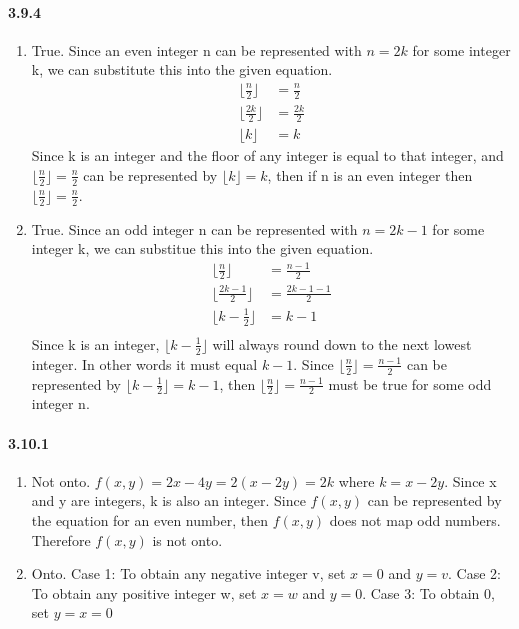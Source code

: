 \documentclass[11pt, letterpaper, twocolumn, fleqn]{article}
\begin{document}
    \paragraph{3.9.4}
    \renewcommand{\labelenumi}{\alph{enumi}.}
    \begin{enumerate}
        \item 
            True. Since an even integer n can be represented with $n = 2k$ for some integer k, we can substitute this into the given equation. 
            \begin{align*}
                \lfloor \frac{n}{2} \rfloor &= \frac{n}{2} \\
                \lfloor \frac{2k}{2} \rfloor &= \frac{2k}{2} \\
                \lfloor k \rfloor &= k
            \end{align*}
            Since k is an integer and the floor of any integer is equal to that integer, and $\lfloor \frac{n}{2} \rfloor = \frac{n}{2}$ can be represented by $\lfloor k \rfloor = k$, then if n is an even integer then $\lfloor \frac{n}{2} \rfloor = \frac{n}{2}$.
        \item 
            True. Since an odd integer n can be represented with $n = 2k-1$ for some integer k, we can substitue this into the given equation.
            \begin{align*}
                \lfloor \frac{n}{2} \rfloor     &= \frac{n-1}{2} \\
                \lfloor \frac{2k-1}{2} \rfloor  &= \frac{2k-1-1}{2} \\
                \lfloor k - \frac{1}{2} \rfloor &= k-1 \\
            \end{align*}
            Since k is an integer, $\lfloor k - \frac{1}{2} \rfloor$ will always round down to the next lowest integer. In other words it must equal $k-1$. Since $\lfloor \frac{n}{2} \rfloor = \frac{n-1}{2}$ can be represented by $\lfloor k - \frac{1}{2} \rfloor = k-1$, then $\lfloor \frac{n}{2} \rfloor = \frac{n-1}{2}$ must be true for some odd integer n.
    \end{enumerate}
    
    \paragraph{3.10.1}
    \renewcommand{\labelenumi}{\alph{enumi}.}
    \begin{enumerate}
        \item Not onto. $f(x,y)=2x-4y=2(x-2y)=2k$ where $k=x-2y$. Since x and y are integers, k is also an integer. Since $f(x,y)$ can be represented by the equation for an even number, then $f(x,y)$ does not map odd numbers. Therefore $f(x,y)$ is not onto.
        \item Onto. \newline
        Case 1: To obtain any negative integer v, set $x = 0$ and $y = v$. \newline
        Case 2: To obtain any positive integer w, set $x=w$ and $y = 0$. \newline
        Case 3: To obtain 0, set $y=x=0$
    \end{enumerate}
    
\end{document}
